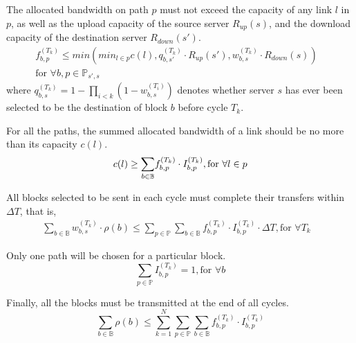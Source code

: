 \begin{packeditemize}
\item The allocated bandwidth on path $p$ must not exceed the 
capacity of any link $l$ in $p$, as well as the upload capacity of 
the source server $R_{up}(s)$, and the download capacity of the 
destination server $R_{down}(s')$.
\begin{equation}
\begin{split}
f^{(T_k)}_{b,p} \leq min\left(min_{l\in p} c(l), 
q_{b,s'}^{(T_k)}\cdot R_{up}(s'), 
w_{b,s}^{(T_k)}\cdot R_{down}(s)\right) &\\
\text{for }\forall b, p\in \mathbb{P}_{s',s} &
\end{split}
\end{equation}
where $q_{b,s}^{(T_k)} = 1-\prod_{i<k} (1-w_{b,s}^{(T_i)})$ denotes
whether server $s$ has ever been selected to be the destination of 
block $b$ before cycle $T_k$.

\item For all the paths, the summed allocated bandwidth of a link 
should be no more than its capacity $c(l)$.
\begin{equation}
c(l) \geq \displaystyle{\sum_{b \in \mathbb{B}}} 
f^{(T_k)}_{b,p}\cdot I^{(T_k)}_{b,p}, 
\text{for }\forall l\in p\\
\end{equation}

\item All blocks selected to be sent in each cycle must complete 
their transfers within $\Delta T$, that is,
\begin{equation}
\begin{split}
\displaystyle{\sum_{b \in \mathbb{B}}} w_{b,s}^{(T_k)} \cdot \rho(b)
\leq \displaystyle{\sum_{p\in \mathbb{P}}} 
\displaystyle{\sum_{b \in \mathbb{B}}} f^{(T_k)}_{b,p} \cdot 
I^{(T_k)}_{b,p} \cdot \Delta T,
\text{for }\forall T_k &
\end{split}
\end{equation}

\item Only one path will be chosen for a particular block.
\begin{equation}
\displaystyle{\sum_{p \in \mathbb{P}}} I^{(T_k)}_{b,p} = 1, \text{for }\forall b
\end{equation}

\item Finally, all the blocks must be transmitted at the end of all
cycles.
\begin{equation}
\displaystyle{\sum_{b\in \mathbb{B}}} \rho(b) \leq
\displaystyle{\sum_{k=1}^{N}} 
\displaystyle{\sum_{p\in \mathbb{P}}} 
\displaystyle{\sum_{b\in \mathbb{B}}} 
f_{b,p}^{(T_k)} \cdot I_{b,p}^{(T_k)}
\end{equation}
\end{packeditemize}


